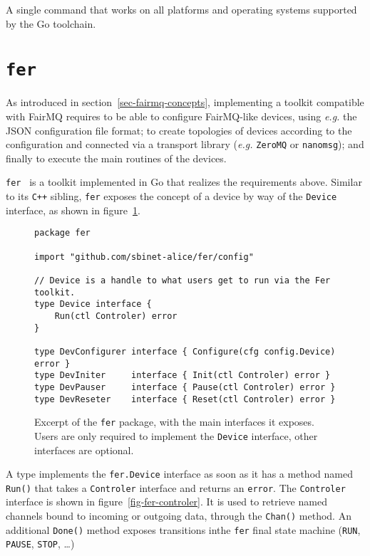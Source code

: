 \documentclass{webofc}
\begin{document}
A single command that works on all platforms and operating systems supported by the Go toolchain.

\section{\texttt{fer}}
\label{sec-fer}

As introduced in section~\ref{sec-fairmq-concepts}, implementing a toolkit compatible with FairMQ requires to be able to configure FairMQ-like devices, using \emph{e.g.} the JSON configuration file format; to create topologies of devices according to the configuration and connected via a transport library (\emph{e.g.} \texttt{ZeroMQ} or \texttt{nanomsg}); and finally to execute the main routines of the devices.

\texttt{fer}~\cite{ref-fer} is a toolkit implemented in Go that realizes the requirements above.
Similar to its \texttt{C++} sibling, \texttt{fer} exposes the concept of a device by way of the \texttt{Device} interface, as shown in figure~\ref{fig-fer-device}.

\begin{figure}[h]
\centering
\begin{verbatim}
package fer

import "github.com/sbinet-alice/fer/config"

// Device is a handle to what users get to run via the Fer toolkit.
type Device interface {
	Run(ctl Controler) error
}

type DevConfigurer interface { Configure(cfg config.Device) error }
type DevIniter     interface { Init(ctl Controler) error }
type DevPauser     interface { Pause(ctl Controler) error }
type DevReseter    interface { Reset(ctl Controler) error }
\end{verbatim}
	\caption{Excerpt of the \texttt{fer} package, with the main interfaces it exposes. Users are only required to implement the \texttt{Device} interface, other interfaces are optional.}
\label{fig-fer-device}
\end{figure}

A type implements the \texttt{fer.Device} interface as soon as it has a method named \texttt{Run()} that takes a \texttt{Controler} interface and returns an \texttt{error}.
The \texttt{Controler} interface is shown in figure~\ref{fig-fer-controler}.
It is used to retrieve named channels bound to incoming or outgoing data, through the \texttt{Chan()} method.
An additional \texttt{Done()} method exposes transitions inthe \texttt{fer} final state machine (\texttt{RUN}, \texttt{PAUSE}, \texttt{STOP}, \ldots)
\end{document}
